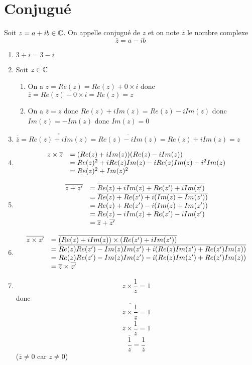 \section{Conjugué}
Soit $z = a+ib \in \mathbb{C}$. On appelle conjugué de $z$ et on note $\overline{z}$ le nombre complexe $$\overline{z} = a - ib$$
\begin{enumerate}
\item $\overline{3 + i} = 3 - i$
\item Soit $z\in\mathbb{C}$ \begin{enumerate} \item On a $z = Re(z) = Re(z) +0\times i$ donc $\overline{z} = Re(z) - 0 \times i = Re(z) = z$ \item On a $\overline{z}=z$ donc $Re(z) + iIm(z) = Re(z) - iIm(z)$ donc $Im(z) = -Im(z)$ donc $Im(z) = 0$ \end{enumerate}
\item $\overline{\overline{z}} = \overline{\overline{Re(z) + iIm(z)}} = \overline{Re(z) - iIm(z)} = Re(z) + iIm(z)=z$
\item 
$$
\begin{array}{l l}
z \times \overline{z} &= (Re(z) + iIm(z))(Re(z) - iIm(z))\\
& = Re(z)^2 +iRe(z)Im(z) - iRe(z)Im(z) -i^2Im(z)\\
& = Re(z)^2 + Im(z)^2
\end{array}
$$
\item $$
\begin{array}{l l}
\overline{z + z'} &= \overline{Re(z)+iIm(z) + Re(z') + iIm(z')} \\
&= \overline{Re(z) + Re(z') + i(Im(z)+Im(z'))} \\
&= Re(z) + Re(z') - i(Im(z)+Im(z'))\\
&= Re(z) - iIm(z) + Re(z') - iIm(z')\\
&= \overline{z} + \overline{z'}
\end{array}
$$
\item $$
\begin{array}{l l}
\overline{z \times z'} &= \overline{(Re(z)+iIm(z)) \times (Re(z') + iIm(z'))} \\
&= \overline{Re(z)Re(z') - Im(z)Im(z') + i(Re(z)Im(z') + Re(z')Im(z))} \\
&= Re(z)Re(z') - Im(z)Im(z') - i(Re(z)Im(z') + Re(z')Im(z))\\
&= \overline{z} \times \overline{z'}
\end{array}
$$
\item $$z \times \frac{1}{z} = 1$$
donc 
$$\overline{z \times \frac{1}{z} } = 1$$
$$\overline{z} \times \overline{\frac{1}{z}} = 1$$
$$\overline{\frac{1}{z}} = \frac{1}{\overline{z}}$$
($\overline{z} \neq 0$ car $z\neq 0$)
\end{enumerate}
